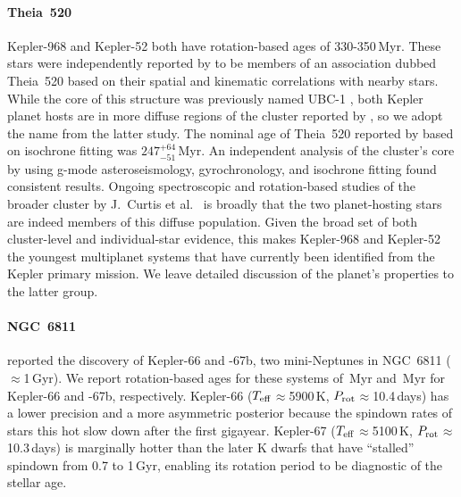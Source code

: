 \documentclass[11pt,twocolumn,tighten]{aastex63}
\begin{document}
\paragraph{Theia~520}
Kepler-968 and Kepler-52 both have rotation-based ages of
330-350\,Myr.  These stars were independently reported by
\citet{2019AJ....158..122K} to be members of an association dubbed
Theia~520 based on their spatial and kinematic correlations with
nearby stars.  While the core of this structure was previously named
UBC-1 \citep{2018A&A...618A..59C}, both Kepler planet hosts are in
more diffuse regions of the cluster reported by
\citet{2019AJ....158..122K}, so we adopt the name from the latter
study.  The nominal age of Theia~520 reported by
\citet{2019AJ....158..122K} based on isochrone fitting was
$247^{+64}_{-51}$\,Myr.  An independent analysis of the cluster's core
by \citet{2024A&A...681A..13F} using g-mode asteroseismology,
gyrochronology, and isochrone fitting found consistent results.
Ongoing spectroscopic and rotation-based studies of the broader
cluster by J.~Curtis et al.~ is broadly that the two planet-hosting
stars are indeed members of this diffuse population.  Given the broad
set of both cluster-level and individual-star evidence, this makes
Kepler-968 and Kepler-52 the youngest multiplanet systems that have
currently been identified from the Kepler primary mission.
We leave detailed discussion of the planet's properties to the latter 
group.

\paragraph{NGC~6811}
\citet{Meibom_2013} reported the discovery of Kepler-66 and -67b, two
mini-Neptunes in NGC~6811 ($\approx$1\,Gyr).  We report rotation-based
ages for these systems of \kepsixsixtgyro\,Myr and \kepsixseventgyro\,Myr for
Kepler-66 and -67b, respectively.  Kepler-66 ($T_{\rm
eff}$$\approx$5900\,K, $P_{\rm rot}$$\approx$10.4\,days) has a lower
precision and a more asymmetric posterior because the spindown rates
of stars this hot slow down after the first gigayear.
Kepler-67 ($T_{\rm eff}$$\approx$5100\,K, $P_{\rm
rot}$$\approx$10.3\,days) is marginally hotter than the later K dwarfs
that have ``stalled'' spindown from 0.7 to 1\,Gyr, enabling its
rotation period to be diagnostic of the stellar age.
\end{document}
